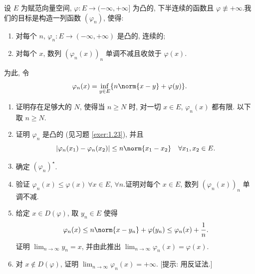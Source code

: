 \begin{exercise}[用下卷积作正则化.]
\label{exer:1.24}
设 $E$ 为赋范向量空间, $\varphi:E\to(-\infty,+\infty]$ 为凸的, 下半连续的函数且
$\varphi\not\equiv+\infty$.我们的目标是构造一列函数 $(\varphi_n)$, 使得:
\begin{enumerate}[label=(\roman*), leftmargin=2.4em, itemsep=0.15em]
	\item 对每个 $n$, $\varphi_n:E\to(-\infty,+\infty)$ 是凸的, 连续的;
	\item 对每个 $x$, 数列 $(\varphi_n(x))_n$ 单调不减且收敛于 $\varphi(x)$.
\end{enumerate}
为此, 令
\begin{equation*}
\varphi_n(x)=\inf_{y\in E}\{n\norm{x-y}+\varphi(y)\}.
\end{equation*}

\begin{enumerate}[label=\arabic*., leftmargin=2.2em, itemsep=0.25em]
	\item 证明存在足够大的 $N$, 使得当 $n\ge N$ 时, 对一切 $x\in E$, $\varphi_n(x)$ 都有限.
	      以下取 $n\ge N$.
	\item 证明 $\varphi_n$ 是凸的 (见习题  \ref{exer:1.23}), 并且
	      \begin{equation*}
	      \abs{\varphi_n(x_1)-\varphi_n(x_2)}\le n\norm{x_1-x_2}
	      \quad \forall x_1,x_2\in E.
	      \end{equation*}
	\item 确定 $(\varphi_n)^\star$.
	\item 验证 $\varphi_n(x)\le\varphi(x)\ \forall x\in E$, $\forall n$.证明对每个 $x\in E$,
	      数列 $(\varphi_n(x))_n$ 单调不减.
	\item 给定 $x\in D(\varphi)$, 取 $y_n\in E$ 使得
	      \begin{equation*}
	      \varphi_n(x)\le n\norm{x-y_n}+\varphi(y_n)\le\varphi_n(x)+\frac{1}{n}.
	      \end{equation*}
	      证明 $\lim_{n\to\infty}y_n=x$, 并由此推出 $\lim_{n\to\infty}\varphi_n(x)=\varphi(x)$.
	\item 对 $x\notin D(\varphi)$, 证明 $\lim_{n\to\infty}\varphi_n(x)=+\infty$.
	      [提示: 用反证法.]
\end{enumerate}
\end{exercise}

